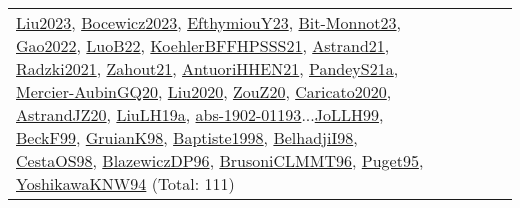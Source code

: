 {\begin{longtable}{p{3cm}r>{\raggedright\arraybackslash}p{6cm}>{\raggedright\arraybackslash}p{6cm}>{\raggedright\arraybackslash}p{8cm}}
\hyperref[detail:Liu2023]{Liu2023}, \hyperref[detail:Bocewicz2023]{Bocewicz2023}, \hyperref[detail:EfthymiouY23]{EfthymiouY23}, \hyperref[detail:Bit-Monnot23]{Bit-Monnot23}, \hyperref[detail:Gao2022]{Gao2022}, \hyperref[detail:LuoB22]{LuoB22}, \hyperref[detail:KoehlerBFFHPSSS21]{KoehlerBFFHPSSS21}, \hyperref[detail:Astrand21]{Astrand21}, \hyperref[detail:Radzki2021]{Radzki2021}, \hyperref[detail:Zahout21]{Zahout21}, \hyperref[detail:AntuoriHHEN21]{AntuoriHHEN21}, \hyperref[detail:PandeyS21a]{PandeyS21a}, \hyperref[detail:Mercier-AubinGQ20]{Mercier-AubinGQ20}, \hyperref[detail:Liu2020]{Liu2020}, \hyperref[detail:ZouZ20]{ZouZ20}, \hyperref[detail:Caricato2020]{Caricato2020}, \hyperref[detail:AstrandJZ20]{AstrandJZ20}, \hyperref[detail:LiuLH19a]{LiuLH19a}, \hyperref[detail:abs-1902-01193]{abs-1902-01193}...\hyperref[detail:JoLLH99]{JoLLH99}, \hyperref[detail:BeckF99]{BeckF99}, \hyperref[detail:GruianK98]{GruianK98}, \hyperref[detail:Baptiste1998]{Baptiste1998}, \hyperref[detail:BelhadjiI98]{BelhadjiI98}, \hyperref[detail:CestaOS98]{CestaOS98}, \hyperref[detail:BlazewiczDP96]{BlazewiczDP96}, \hyperref[detail:BrusoniCLMMT96]{BrusoniCLMMT96}, \hyperref[detail:Puget95]{Puget95}, \hyperref[detail:YoshikawaKNW94]{YoshikawaKNW94} (Total: 111)\\

\end{longtable}}
